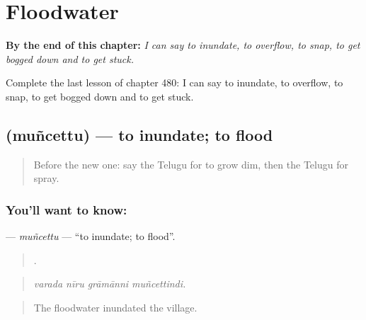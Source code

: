
\chapter{Floodwater}
\label{ch:te-floodwater}

\begin{chapteropening}
\textbf{By the end of this chapter:} \emph{I can say to inundate, to overflow, to snap, to get bogged down and to get stuck.}

Complete the last lesson of chapter 480: I can say to inundate, to overflow, to snap, to get bogged down and to get stuck.
\end{chapteropening}

\section[\texorpdfstring{\te{ముంచెత్తు} (muñcettu)}{ముంచెత్తు (muñcettu)}]{ (muñcettu) — to inundate; to flood}

\label{lesson:TE-C480-muncettu}



\begin{quote}
Before the new one: say the Telugu for to grow dim, then the Telugu for spray.
\end{quote}

\subsection*{You'll want to know: }
\textbf{} — \emph{muñcettu} — \textquotedblleft{}to inundate; to flood\textquotedblright{}.

\begin{quote}
   .
\end{quote}

\begin{quote}
\emph{varada nīru grāmānni muñcettindi.}
\end{quote}

\begin{quote}
The floodwater inundated the village.
\end{quote}

